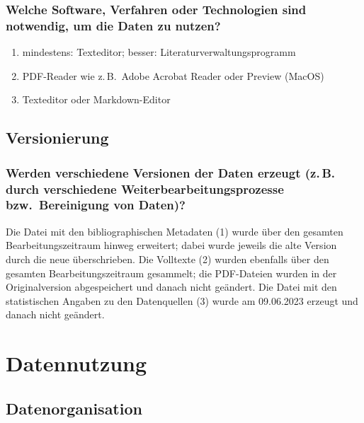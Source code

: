 \documentclass[%
  11pt,
  DIV=16,
  a4paper,
  BCOR=15mm,
  twoside=on,
  bibliography=totoc,
  headings=normal,
  numbers=noendperiod,
]{scrartcl}
\begin{document}
\subsubsection{Welche Software, Verfahren oder Technologien sind notwendig, um die Daten zu nutzen?}

\begin{enumerate}[(1)]
  \item
    mindestens: Texteditor; besser: Literaturverwaltungsprogramm
  \item
    PDF-Reader wie z.\,B.\ Adobe Acrobat Reader oder Preview (MacOS)
  \item
    Texteditor oder Markdown-Editor
\end{enumerate}

\subsection{Versionierung}

\subsubsection{Werden verschiedene Versionen der Daten erzeugt (\texorpdfstring{z.\,B.}{z.B.} durch verschiedene Weiterbearbeitungsprozesse bzw.\ Bereinigung von Daten)?}

Die Datei mit den bibliographischen Metadaten (1) wurde über den gesamten Bearbeitungszeitraum hinweg erweitert;
dabei wurde jeweils die alte Version durch die neue überschrieben.
Die Volltexte (2) wurden ebenfalls über den gesamten Bearbeitungszeitraum gesammelt; die PDF-Dateien wurden in der Originalversion abgespeichert
und danach nicht geändert.
Die Datei mit den statistischen Angaben zu den Datenquellen (3) wurde am 09.06.2023 erzeugt und danach nicht geändert.

\section{Datennutzung}

\subsection{Datenorganisation}
\end{document}
